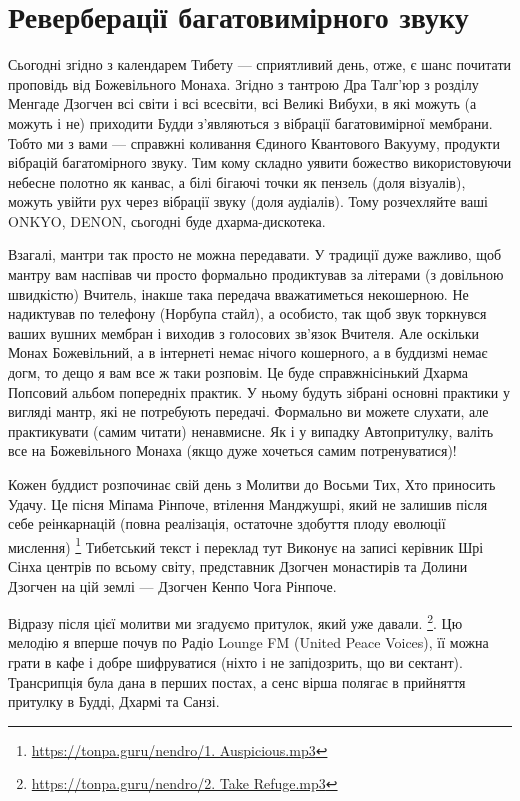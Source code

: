 \section{Реверберації багатовимірного звуку}

Сьогодні згідно з календарем Тибету --- сприятливий день,
отже, є шанс почитати проповідь від Божевільного Монаха.
Згідно з тантрою Дра Талг'юр з розділу Менгаде Дзогчен всі
світи і всі всесвіти, всі Великі Вибухи, в які можуть
(а можуть і не) приходити Будди з'являються з вібрації
багатовимірної мембрани. Тобто ми з вами --- справжні
коливання Єдиного Квантового Вакууму, продукти
вібрацій багатомірного звуку. Тим кому складно уявити
божество використовуючи небесне полотно як канвас, а білі
бігаючі точки як пензель (доля візуалів), можуть увійти
рух через вібрації звуку (доля аудіалів). Тому
розчехляйте ваші ONKYO, DENON, сьогодні буде дхарма-дискотека.

Взагалі, мантри так просто не можна передавати. У традиції
дуже важливо, щоб мантру вам наспівав чи просто формально
продиктував за літерами (з довільною швидкістю) Вчитель,
інакше така передача вважатиметься некошерною. Не надиктував
по телефону (Норбупа стайл), а особисто, так щоб звук
торкнувся ваших вушних мембран і виходив з голосових
зв'язок Вчителя. Але оскільки Монах Божевільний, а в інтернеті
немає нічого кошерного, а в буддизмі немає догм, то дещо я
вам все ж таки розповім. Це буде справжнісінький Дхарма Попсовий
альбом попередніх практик. У ньому будуть зібрані основні
практики у вигляді мантр, які не потребують передачі. Формально
ви можете слухати, але практикувати (самим читати) ненавмисне.
Як і у випадку Автопритулку, валіть все на Божевільного
Монаха (якщо дуже хочеться самим потренуватися)!

Кожен буддист розпочинає свій день з Молитви до Восьми
Тих, Хто приносить Удачу. Це пісня Міпама Рінпоче, втілення
Манджушрі, який не залишив після себе реінкарнацій (повна
реалізація, остаточне здобуття плоду еволюції мислення)
\footnote {\url{https://tonpa.guru/nendro/1. Auspicious.mp3}}
Тибетський текст і переклад тут Виконує на записі керівник Шрі
Сінха центрів по всьому світу, представник Дзогчен монастирів
та Долини Дзогчен на цій землі --- Дзогчен Кенпо Чога Рінпоче.

Відразу після цієї молитви ми згадуємо притулок, який уже давали.
\footnote{\url{https://tonpa.guru/nendro/2. Take Refuge.mp3}}.
Цю мелодію я вперше почув по Радіо Lounge FM (United Peace Voices),
її можна грати в кафе і добре шифруватися (ніхто і не запідозрить, що ви сектант).
Трансрипція була дана в перших постах, а сенс вірша полягає в
прийняття притулку в Будді, Дхармі та Санзі.

